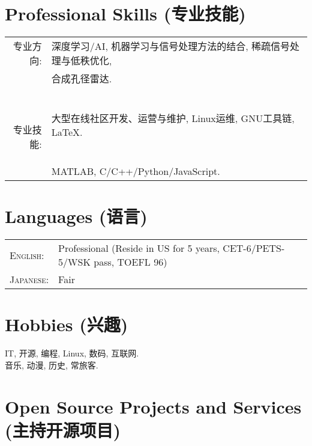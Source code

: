 \documentclass[paper=a4,fontsize=11pt]{scrartcl}
\begin{document}
\section*{Professional Skills (专业技能)}

\begin{tabular}{rl}

专业方向: & 深度学习/AI, 机器学习与信号处理方法的结合, 稀疏信号处理与低秩优化,\\
		 & 合成孔径雷达.\\

~

专业技能: & 大型在线社区开发、运营与维护, Linux运维, GNU工具链, \LaTeX.\\
 	& MATLAB, C/C++/Python/JavaScript.
\end{tabular}

\section*{Languages (语言)}

\begin{tabular}{ll}
	
	\textsc{English:} & Professional (Reside in US for 5 years, CET-6/PETS-5/WSK pass, TOEFL 96) \\
	
	\textsc{Japanese:} & Fair\\
\end{tabular}


\section*{Hobbies (兴趣)}

IT, 开源, 编程, Linux, 数码, 互联网.\\
音乐, 动漫, 历史, 常旅客.\\

\section*{Open Source Projects and Services (主持开源项目)}
\end{document}
